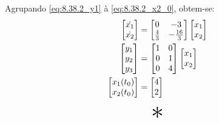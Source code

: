 \documentclass{report}
\begin{document}
Agrupando \ref{eq:8.38.2_y1} à \ref{eq:8.38.2_x2_0}, obtem-se:
\begin{equation}
      \label{eq:8.38.2_sol}
      \centering
      \begin{split}
          \begin{bmatrix} \dot{x_1} \\ \dot{x_2} \end{bmatrix} &= \begin{bmatrix} 0 & -3 \\ \frac{4}{3} & -\frac{16}{3} \end{bmatrix}
          \begin{bmatrix} x_1 \\ x_2 \end{bmatrix} \\
          \begin{bmatrix} y_1 \\ y_2 \\ y_3 \end{bmatrix} &= \begin{bmatrix} 1 & 0 \\ 0 & 1 \\ 0 & 4 \end{bmatrix}
          \begin{bmatrix} x_1 \\ x_2 \end{bmatrix} \\
          \begin{bmatrix} x_1(t_0) \\ x_2(t_0) \end{bmatrix} &= \begin{bmatrix} 4 \\ 2 \end{bmatrix}
      \end{split}
\end{equation}

\begin{center}
      \[ \scalebox{3}{$ * $} \]
\end{center}
\end{document}
